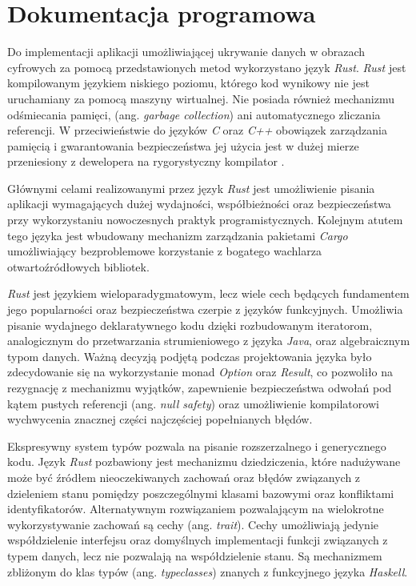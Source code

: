 {    %
    \section{Dokumentacja programowa}
    {
        Do implementacji aplikacji umożliwiającej ukrywanie danych w obrazach cyfrowych za pomocą przedstawionych metod
        wykorzystano język \textit{Rust}. \textit{Rust} jest kompilowanym językiem niskiego poziomu, którego kod
        wynikowy nie jest uruchamiany za pomocą maszyny wirtualnej. Nie posiada również mechanizmu odśmiecania pamięci,
        (ang. \textit{garbage collection}) ani automatycznego zliczania referencji. W przeciwieństwie do języków
        \textit{C} oraz \textit{C++} obowiązek zarządzania pamięcią i gwarantowania bezpieczeństwa jej użycia jest w
        dużej mierze przeniesiony z dewelopera na rygorystyczny kompilator \cite{Cosmin2019RustT, Matsakis2014TheRL,
        RustHomePage}.

        Głównymi celami realizowanymi przez język \textit{Rust} jest umożliwienie pisania aplikacji wymagających dużej
        wydajności, współbieżności oraz bezpieczeństwa przy wykorzystaniu nowoczesnych praktyk programistycznych.
        Kolejnym atutem tego języka jest wbudowany mechanizm zarządzania pakietami \textit{Cargo} umożliwiający
        bezproblemowe korzystanie z bogatego wachlarza otwartoźródłowych bibliotek.

        \textit{Rust} jest językiem wieloparadygmatowym, lecz wiele cech będących fundamentem jego popularności oraz
        bezpieczeństwa czerpie z języków funkcyjnych. Umożliwia pisanie wydajnego deklaratywnego kodu dzięki
        rozbudowanym iteratorom, analogicznym do przetwarzania strumieniowego z języka \textit{Java}, oraz algebraicznym
        typom danych. Ważną decyzją podjętą podczas projektowania języka było zdecydowanie się na wykorzystanie monad
        \textit{Option} oraz \textit{Result}, co pozwoliło na rezygnację z mechanizmu wyjątków, zapewnienie
        bezpieczeństwa odwołań pod kątem pustych referencji (ang. \textit{null safety}) oraz umożliwienie kompilatorowi
        wychwycenia znacznej części najczęściej popełnianych błędów.

        Ekspresywny system typów pozwala na pisanie rozszerzalnego i generycznego kodu. Język \textit{Rust} pozbawiony
        jest mechanizmu dziedziczenia, które nadużywane może być źródłem nieoczekiwanych zachowań oraz błędów związanych
        z dzieleniem stanu pomiędzy poszczególnymi klasami bazowymi oraz konfliktami identyfikatorów. Alternatywnym
        rozwiązaniem pozwalającym na wielokrotne wykorzystywanie zachowań są cechy (ang. \textit{trait}). Cechy
        umożliwiają jedynie współdzielenie interfejsu oraz domyślnych implementacji funkcji związanych z typem danych,
        lecz nie pozwalają na współdzielenie stanu. Są mechanizmem zbliżonym do klas typów (ang. \textit{typeclasses})
        znanych z funkcyjnego języka \textit{Haskell}.

}}
